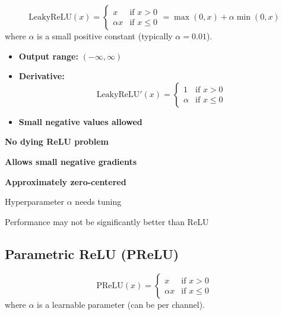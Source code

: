 \begin{equation}
\text{LeakyReLU}(x) = 
\begin{cases}
x & \text{if } x > 0 \\
\alpha x & \text{if } x \leq 0
\end{cases}
= \max(0, x) + \alpha \min(0, x)
\end{equation}
where $\alpha$ is a small positive constant (typically $\alpha = 0.01$).

\begin{properties}
\begin{itemize}
    \item \textbf{Output range:} $(-\infty, \infty)$
    \item \textbf{Derivative:} 
    \begin{equation}
    \text{LeakyReLU}'(x) = 
    \begin{cases}
    1 & \text{if } x > 0 \\
    \alpha & \text{if } x \leq 0
    \end{cases}
    \end{equation}
    \item \textbf{Small negative values allowed}
\end{itemize}
\end{properties}

\begin{advantages}
    \item \textbf{No dying ReLU problem}
    \item \textbf{Allows small negative gradients}
    \item \textbf{Approximately zero-centered}
\end{advantages}

\begin{disadvantages}
    \item Hyperparameter $\alpha$ needs tuning
    \item Performance may not be significantly better than ReLU
\end{disadvantages}

\subsection{Parametric ReLU (PReLU)}

\begin{equation}
\text{PReLU}(x) = 
\begin{cases}
x & \text{if } x > 0 \\
\alpha x & \text{if } x \leq 0
\end{cases}
\end{equation}
where $\alpha$ is a learnable parameter (can be per channel).


